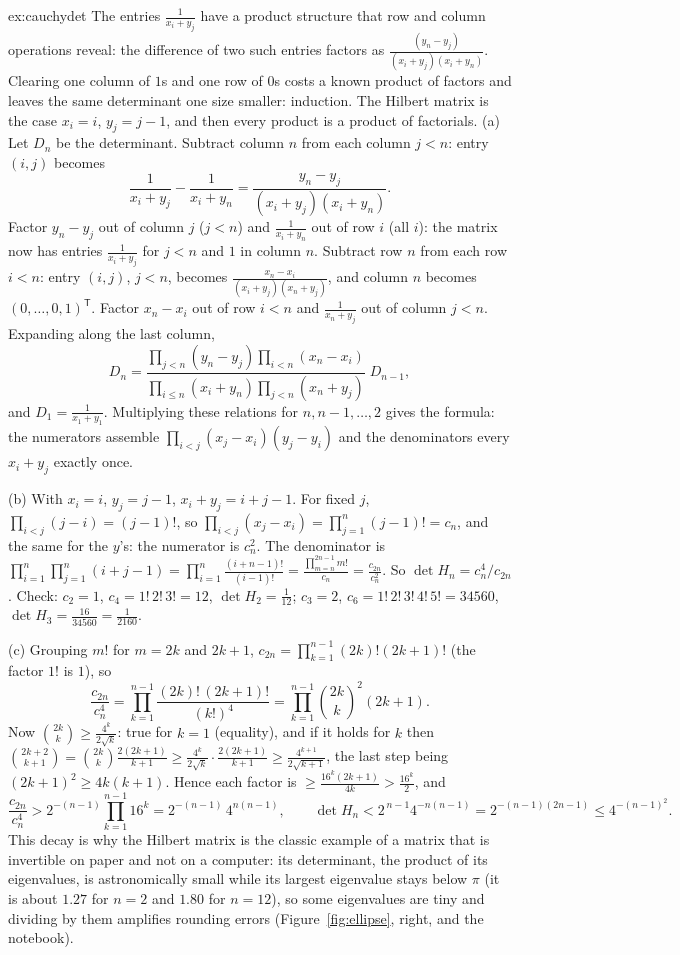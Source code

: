 \begin{solution}{ex:cauchydet}
\idea The entries $\frac1{x_i+y_j}$ have a product structure that row and column operations reveal: the difference of two such entries factors as $\frac{(y_n-y_j)}{(x_i+y_j)(x_i+y_n)}$. Clearing one column of $1$s and one row of $0$s costs a known product of factors and leaves the same determinant one size smaller: induction. The Hilbert matrix is the case $x_i=i$, $y_j=j-1$, and then every product is a product of factorials.
\writeup (a) Let $D_n$ be the determinant. Subtract column $n$ from each column $j<n$: entry $(i,j)$ becomes
\[
\frac1{x_i+y_j}-\frac1{x_i+y_n}=\frac{y_n-y_j}{(x_i+y_j)(x_i+y_n)} .
\]
Factor $y_n-y_j$ out of column $j$ ($j<n$) and $\frac1{x_i+y_n}$ out of row $i$ (all $i$): the matrix now has entries $\frac1{x_i+y_j}$ for $j<n$ and $1$ in column $n$. Subtract row $n$ from each row $i<n$: entry $(i,j)$, $j<n$, becomes $\frac{x_n-x_i}{(x_i+y_j)(x_n+y_j)}$, and column $n$ becomes $(0,\dots,0,1)^{\mathsf T}$. Factor $x_n-x_i$ out of row $i<n$ and $\frac1{x_n+y_j}$ out of column $j<n$. Expanding along the last column,
\[
D_n=\frac{\prod_{j<n}(y_n-y_j)\prod_{i<n}(x_n-x_i)}{\prod_{i\le n}(x_i+y_n)\prod_{j<n}(x_n+y_j)}\;D_{n-1},
\]
and $D_1=\frac1{x_1+y_1}$. Multiplying these relations for $n,n-1,\dots,2$ gives the formula: the numerators assemble $\prod_{i<j}(x_j-x_i)(y_j-y_i)$ and the denominators every $x_i+y_j$ exactly once.

(b) With $x_i=i$, $y_j=j-1$, $x_i+y_j=i+j-1$. For fixed $j$, $\prod_{i<j}(j-i)=(j-1)!$, so $\prod_{i<j}(x_j-x_i)=\prod_{j=1}^n(j-1)!=c_n$, and the same for the $y$'s: the numerator is $c_n^2$. The denominator is $\prod_{i=1}^n\prod_{j=1}^n(i+j-1)=\prod_{i=1}^n\frac{(i+n-1)!}{(i-1)!}=\frac{\prod_{m=n}^{2n-1}m!}{c_n}=\frac{c_{2n}}{c_n^2}$. So $\det H_n=c_n^4/c_{2n}$. Check: $c_2=1$, $c_4=1!\,2!\,3!=12$, $\det H_2=\frac1{12}$; $c_3=2$, $c_6=1!\,2!\,3!\,4!\,5!=34560$, $\det H_3=\frac{16}{34560}=\frac1{2160}$.

(c) Grouping $m!$ for $m=2k$ and $2k+1$, $c_{2n}=\prod_{k=1}^{n-1}(2k)!(2k+1)!$ (the factor $1!$ is $1$), so
\[
\frac{c_{2n}}{c_n^4}=\prod_{k=1}^{n-1}\frac{(2k)!\,(2k+1)!}{(k!)^4}=\prod_{k=1}^{n-1}\binom{2k}k^2(2k+1).
\]
Now $\binom{2k}k\ge\frac{4^k}{2\sqrt k}$: true for $k=1$ (equality), and if it holds for $k$ then $\binom{2k+2}{k+1}=\binom{2k}k\frac{2(2k+1)}{k+1}\ge\frac{4^k}{2\sqrt k}\cdot\frac{2(2k+1)}{k+1}\ge\frac{4^{k+1}}{2\sqrt{k+1}}$, the last step being $(2k+1)^2\ge4k(k+1)$. Hence each factor is $\ge\frac{16^k(2k+1)}{4k}>\frac{16^k}2$, and
\[
\frac{c_{2n}}{c_n^4}>2^{-(n-1)}\prod_{k=1}^{n-1}16^k=2^{-(n-1)}\,4^{n(n-1)},\qquad\det H_n<2^{\,n-1}4^{-n(n-1)}=2^{-(n-1)(2n-1)}\le4^{-(n-1)^2}.
\]
This decay is why the Hilbert matrix is the classic example of a matrix that is invertible on paper and not on a computer: its determinant, the product of its eigenvalues, is astronomically small while its largest eigenvalue stays below $\pi$ (it is about $1.27$ for $n=2$ and $1.80$ for $n=12$), so some eigenvalues are tiny and dividing by them amplifies rounding errors (Figure~\ref{fig:ellipse}, right, and the notebook).
\end{solution}

